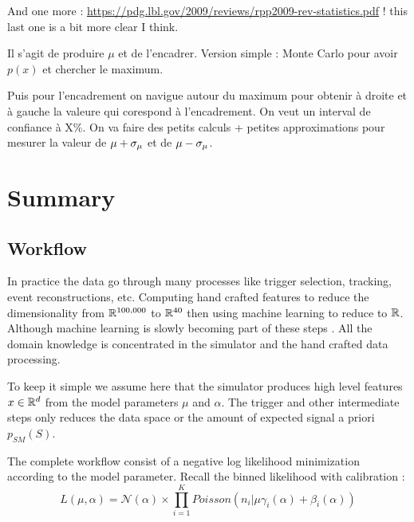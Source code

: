 And one more : \url{https://pdg.lbl.gov/2009/reviews/rpp2009-rev-statistics.pdf} !  this last one is a bit more clear I think.

Il s'agit de produire $\mu$ et de l'encadrer.
Version simple : Monte Carlo pour avoir $p(x)$ et chercher le maximum.

Puis pour l'encadrement on navigue autour du maximum pour obtenir à droite et à gauche la valeure qui corespond à l'encadrement.
On veut un interval de confiance à X\%.
On va faire des petits calculs + petites approximations pour mesurer la valeur de $\mu + \sigma_\mu$ et de $\mu - \sigma_\mu$.







\section{Summary} %
\label{sec:summary}


\subsection{Workflow} %
\label{sub:workflow}


In practice the data go through many processes like trigger selection, tracking, event reconstructions, etc.
Computing hand crafted features to reduce the dimensionality from $\mathbb{R}^{100,000}$ to $\mathbb{R}^{40}$ then using machine learning to reduce to $\mathbb{R}$.
Although machine learning is slowly becoming part of these steps \needcite.
All the domain knowledge is concentrated in the simulator and the hand crafted data processing.

To keep it simple we assume here that the simulator produces high level features $x \in \mathbb{R}^d$ from the model parameters $\mu$ and $\alpha$.
The trigger and other intermediate steps only reduces the data space or the amount of expected signal a priori $p_{SM}(S)$.

The complete workflow consist of a negative log likelihood minimization according to the model parameter.
Recall the binned likelihood with calibration :
\begin{equation}
  L(\mu, \alpha) =\mathcal N (\alpha) \times \prod_{i=1}^K Poisson(n_i | \mu \gamma_i(\alpha) + \beta_i(\alpha) )
\end{equation}

